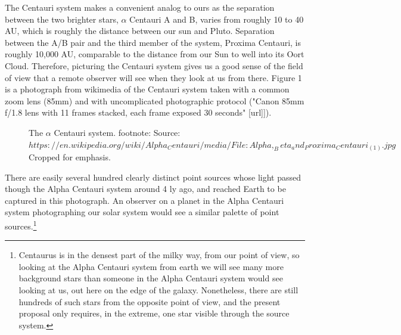 \documentclass{article}
\begin{document}
The Centauri system makes a convenient analog to ours as the separation between the two brighter stars, $\alpha$ Centauri A and B, varies from roughly 10 to 40 AU, which is roughly the distance between our sun and Pluto. Separation between the A/B pair and the third member of the system, Proxima Centauri, is roughly 10,000 AU, comparable to the distance from our Sun to well into its Oort Cloud.  Therefore, picturing the Centauri system gives us a good sense of the field of view that a remote observer will see when they look at us from there. Figure 1 is a photograph from wikimedia of the Centauri system taken with a common zoom lens (85mm) and with uncomplicated photographic protocol ("Canon 85mm f/1.8 lens with 11 frames stacked, each frame exposed 30 seconds" [url]]). 
\begin{figure}
    \centering
        \caption{The $\alpha$ Centauri system. footnote: Source: $https://en.wikipedia.org/wiki/Alpha_Centauri/media/File:Alpha,_Beta_and_Proxima_Centauri_(1).jpg$ Cropped for emphasis.}
    \label{fig:1_centauri_system}
\end{figure}

There are easily several hundred clearly distinct point sources whose light passed though the Alpha Centauri system around 4 ly ago, and reached Earth to be captured in this photograph. An observer on a planet in the Alpha Centauri system photographing our solar system would see a similar palette of point sources.\footnote{Centaurus is in the densest part of the milky way, from our point of view, so looking at the Alpha Centauri system from earth we will see many more background stars than someone in the Alpha Centauri system would see looking at us, out here on the edge of the galaxy. Nonetheless, there are still hundreds of such stars from the opposite point of view, and the present proposal only requires, in the extreme, one star visible through the source system.}
\end{document}
